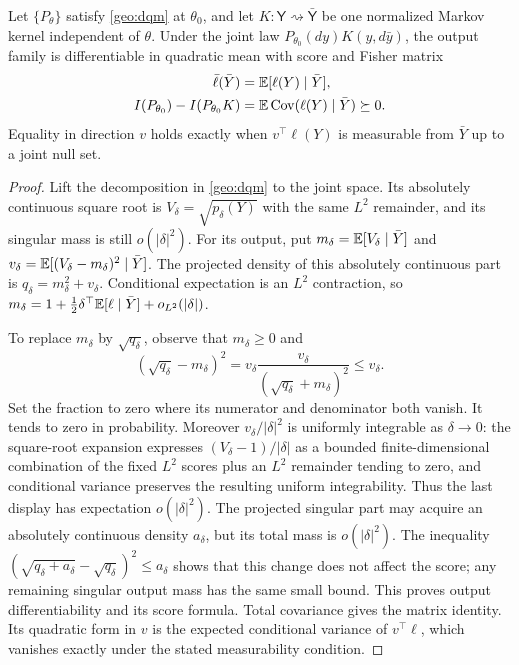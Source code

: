 Let $\{P_\theta\}$ satisfy \cref{geo:dqm} at $\theta_0$, and let $K:\mathsf Y\rightsquigarrow\bar{\mathsf Y}$ be one normalized Markov kernel independent of $\theta$. Under the joint law $P_{\theta_0}(dy)K(y,d\bar y)$, the output family is differentiable in quadratic mean with score and Fisher matrix
\begin{align}
\bar\ell(\bar Y)&=\mathbb E[\ell(Y)\mid\bar Y],\\
I(P_{\theta_0})-I(P_{\theta_0}K)
&=\mathbb E\operatorname{Cov}(\ell(Y)\mid\bar Y)\succeq0.
\label{geo:score-projection}
\end{align}
Equality in direction $v$ holds exactly when $v^\top\ell(Y)$ is measurable from $\bar Y$ up to a joint null set.
\begin{proof}
Lift the decomposition in \cref{geo:dqm} to the joint space. Its absolutely continuous square root is $V_\delta=\sqrt{p_\delta(Y)}$ with the same $L^2$ remainder, and its singular mass is still $o(|\delta|^2)$. For its output, put
$m_\delta=\mathbb E[V_\delta\mid\bar Y]$ and
$v_\delta=\mathbb E[(V_\delta-m_\delta)^2\mid\bar Y]$. The projected density of this absolutely continuous part is
$q_\delta=m_\delta^2+v_\delta$.
Conditional expectation is an $L^2$ contraction, so
$m_\delta=1+\tfrac12\delta^\top\mathbb E[\ell\mid\bar Y]+o_{L^2}(|\delta|)$.

To replace $m_\delta$ by $\sqrt{q_\delta}$, observe that $m_\delta\ge0$ and
\begin{equation}
(\sqrt{q_\delta}-m_\delta)^2
=v_\delta
\frac{v_\delta}{(\sqrt{q_\delta}+m_\delta)^2}
\le v_\delta.
\end{equation}
Set the fraction to zero where its numerator and denominator both vanish. It tends to zero in probability. Moreover $v_\delta/|\delta|^2$ is uniformly integrable as $\delta\to0$: the square-root expansion expresses
$(V_\delta-1)/|\delta|$ as a bounded finite-dimensional combination of the fixed $L^2$ scores plus an $L^2$ remainder tending to zero, and conditional variance preserves the resulting uniform integrability. Thus the last display has expectation $o(|\delta|^2)$.
The projected singular part may acquire an absolutely continuous density $a_\delta$, but its total mass is $o(|\delta|^2)$. The inequality
$(\sqrt{q_\delta+a_\delta}-\sqrt{q_\delta})^2\le a_\delta$
shows that this change does not affect the score; any remaining singular output mass has the same small bound. This proves output differentiability and its score formula. Total covariance gives the matrix identity. Its quadratic form in $v$ is the expected conditional variance of $v^\top\ell$, which vanishes exactly under the stated measurability condition.
\end{proof}

